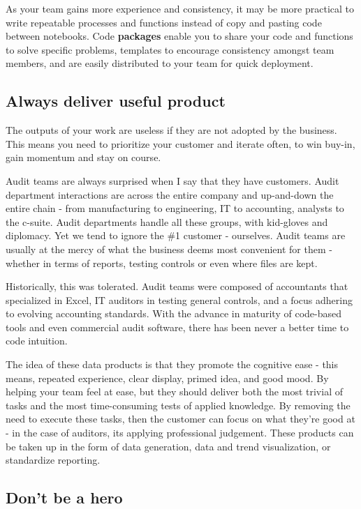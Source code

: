 \documentclass[
]{book}
\begin{document}
As your team gains more experience and consistency, it may be more practical to write repeatable processes and functions instead of copy and pasting code between notebooks. Code \textbf{packages} enable you to share your code and functions to solve specific problems, templates to encourage consistency amongst team members, and are easily distributed to your team for quick deployment.

\hypertarget{always-deliver-useful-product}{%
\subsection{Always deliver useful product}\label{always-deliver-useful-product}}

The outputs of your work are useless if they are not adopted by the business. This means you need to prioritize your customer and iterate often, to win buy-in, gain momentum and stay on course.

Audit teams are always surprised when I say that they have customers. Audit department interactions are across the entire company and up-and-down the entire chain - from manufacturing to engineering, IT to accounting, analysts to the c-suite. Audit departments handle all these groups, with kid-gloves and diplomacy. Yet we tend to ignore the \#1 customer - ourselves. Audit teams are usually at the mercy of what the business deems most convenient for them - whether in terms of reports, testing controls or even where files are kept.

Historically, this was tolerated. Audit teams were composed of accountants that specialized in Excel, IT auditors in testing general controls, and a focus adhering to evolving accounting standards. With the advance in maturity of code-based tools and even commercial audit software, there has been never a better time to code intuition.

The idea of these data products is that they promote the cognitive ease - this means, repeated experience, clear display, primed idea, and good mood.\citep{cognitive-ease} By helping your team feel at ease, but they should deliver both the most trivial of tasks and the most time-consuming tests of applied knowledge. By removing the need to execute these tasks, then the customer can focus on what they're good at - in the case of auditors, its applying professional judgement. These products can be taken up in the form of data generation, data and trend visualization, or standardize reporting.

\hypertarget{dont-be-a-hero}{%
\subsection{Don't be a hero}\label{dont-be-a-hero}}
\end{document}
